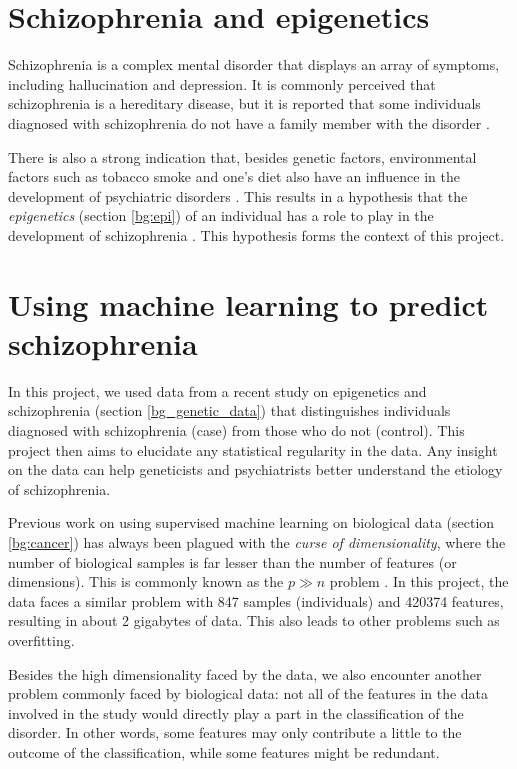 \documentclass[12pt, twoside, a4paper]{report}
\begin{document}
\section{Schizophrenia and epigenetics}
\label{intro:epi}

Schizophrenia is a complex mental disorder that displays an array of symptoms, including hallucination and depression. It is commonly perceived that schizophrenia is a hereditary disease, but it is reported that some individuals diagnosed with schizophrenia do not have a family member with the disorder \cite{RefWorks:8}. 

There is also a strong indication that, besides genetic factors, environmental factors such as tobacco smoke and one's diet also have an influence in the development of psychiatric disorders \cite{RefWorks:8, RefWorks:10, RefWorks:247}. This results in a hypothesis that the \textit{epigenetics} (section \ref{bg:epi}) of an individual has a role to play in the development of schizophrenia \cite{RefWorks:12}. This hypothesis forms the context of this project.


\section{Using machine learning to predict schizophrenia} \label{intro_ML}

In this project, we used data from a recent study on epigenetics and schizophrenia (section \ref{bg_genetic_data}) that distinguishes individuals diagnosed with schizophrenia (case) from those who do not (control). This project then aims to elucidate any statistical regularity in the data. Any insight on the data can help geneticists and psychiatrists better understand the etiology of schizophrenia.

Previous work on using supervised machine learning on biological data (section \ref{bg:cancer}) has always been plagued with the \textit{curse of dimensionality}, where the number of biological samples is far lesser than the number of features (or dimensions). This is commonly known as the $p \gg n$ problem \cite{RefWorks:96}. In this project, the data faces a similar problem with 847 samples (individuals) and 420374 features, resulting in about 2 gigabytes of data. This also leads to other problems such as overfitting. 

Besides the high dimensionality faced by the data, we also encounter another problem commonly faced by biological data: not all of the features in the data involved in the study would directly play a part in the classification of the disorder. In other words, some features may only contribute a little to the outcome of the classification, while some features might be redundant.
\end{document}
